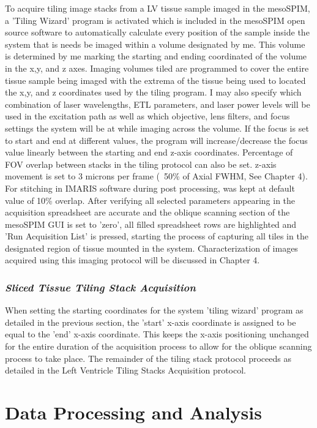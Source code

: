To acquire tiling image stacks from a LV tissue sample imaged in the mesoSPIM, a 'Tiling Wizard' program is activated which is included in the mesoSPIM open source software to automatically calculate every position of the sample inside the system that is needs be imaged within a volume designated by me. This volume is determined by me marking the starting and ending coordinated of the volume in the x,y, and z axes. Imaging volumes tiled are programmed to cover the entire tissue sample being imaged with the extrema of the tissue being used to located the x,y, and z coordinates used by the tiling program. I may also specify which combination of laser wavelengths, ETL parameters, and laser power levels will be used in the excitation path as well as which objective, lens filters, and focus settings the system will be at while imaging across the volume. If the focus is set to start and end at different values, the program will increase/decrease the focus value linearly between the starting and end z-axis coordinates. Percentage of FOV overlap between stacks in the tiling protocol can also be set. z-axis movement is set to 3 microns per frame (~50\% of Axial FWHM, See Chapter 4). For stitching in IMARIS software during post processing, was kept at default value of 10\% overlap. After verifying all selected parameters appearing in the acquisition spreadsheet are accurate and the oblique scanning section of the mesoSPIM GUI is set to 'zero', all filled spreadsheet rows are highlighted and 'Run Acquisition List' is pressed, starting the process of capturing all tiles in the designated region of tissue mounted in the system. Characterization of images acquired using this imaging protocol will be discussed in Chapter 4.

\subsubsection{\textit{Sliced Tissue Tiling Stack Acquisition}}    

 When setting the starting coordinates for the system 'tiling wizard' program as detailed in the previous section, the 'start' x-axis coordinate is assigned to be equal to the 'end' x-axis coordinate. This keeps the x-axis positioning unchanged for the entire duration of the acquisition process to allow for the oblique scanning process to take place. The remainder of the tiling stack protocol proceeds as detailed in the Left Ventricle Tiling Stacks Acquisition protocol.

\section{Data Processing and Analysis}
